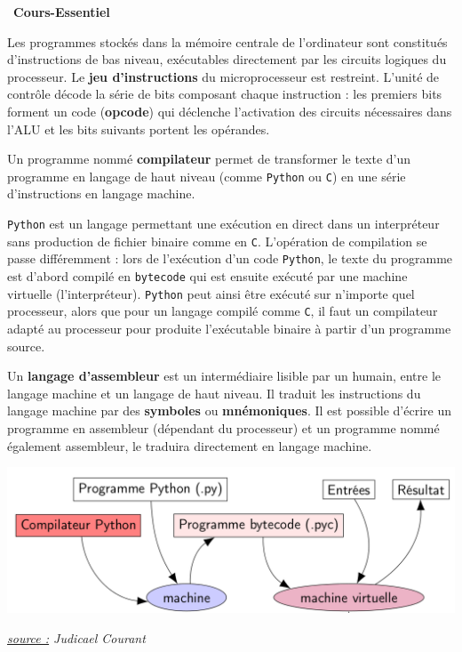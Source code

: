 \documentclass[a4paper, french, 11pt]{article}  %
\newcounter{cours}
\newenvironment{cours}[1]
{\par \medskip   \addtocounter{cours}{1} \noindent  
\begin{bclogo}[arrondi =0.1,  ombre = true, barre=none, logo=\bcbook, marge=4]{~\textbf{Cours-Essentiel} \textbf{\thecours} {\itshape #1} }  \par}
{
\end{bclogo}
 \par \bigskip }
\newcounter{prog}
\begin{document}
\begin{cours}{}

Les programmes stockés dans la mémoire centrale de l'ordinateur sont constitués d'instructions de bas niveau, exécutables directement par les circuits logiques du processeur. Le \textbf{jeu d'instructions} du microprocesseur est restreint.  L'unité de contrôle décode la série de bits composant chaque instruction : les premiers bits forment un code (\textbf{opcode}) qui déclenche l'activation des circuits nécessaires dans l'ALU et les bits suivants portent les opérandes. 

Un programme nommé \textbf{compilateur} permet de transformer le texte d'un programme en langage de haut niveau (comme \texttt{Python} ou \texttt{C}) en une série d'instructions en langage machine.

\texttt{Python} est un langage permettant une exécution en direct dans un interpréteur sans production de fichier binaire comme en \texttt{C}. L'opération de compilation se passe différemment : lors de l'exécution d'un code \texttt{Python}, le texte du programme est d'abord compilé en \texttt{bytecode} qui est ensuite exécuté par une machine virtuelle (l'interpréteur). \texttt{Python} peut ainsi être exécuté sur n'importe quel processeur, alors que pour un langage compilé comme \texttt{C}, il faut un compilateur adapté au processeur pour produite l'exécutable binaire à partir d'un programme source.

Un \textbf{langage d'assembleur} est un intermédiaire lisible par un humain, entre le langage machine et un langage de haut niveau. Il traduit les instructions du langage machine par des \textbf{symboles} ou \textbf{mnémoniques}. Il est possible d'écrire  un programme en assembleur (dépendant du processeur) et un programme nommé également assembleur, le traduira directement en langage machine.

\begin{center}
\includegraphics[scale=0.4]{images/python_bytecode.png}

{\itshape \uline{source :} Judicael Courant }
\end{center}


\end{cours}
\end{document}
